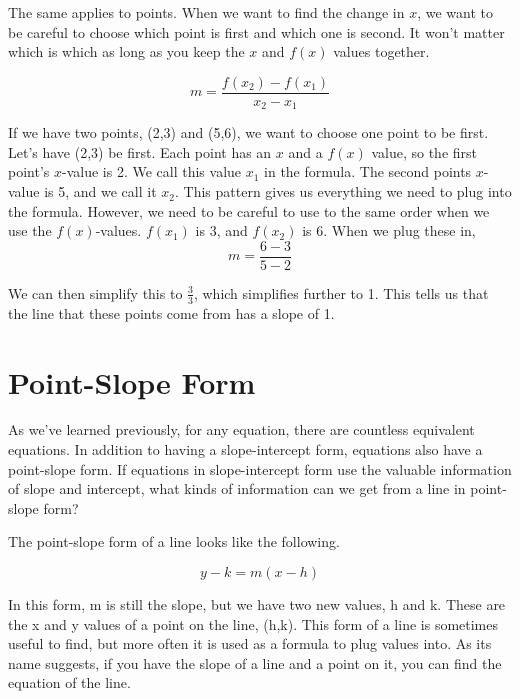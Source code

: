 The same applies to points.  When we want to find the change in $x$, we want to be careful to choose which point is first and which one is second.  It won't matter which is which as long as you keep the $x$ and $f(x)$ values together.

\begin{equation}
m = \frac{f(x_2) - f(x_1)}{x_2 - x_1}
\end{equation}

\begin{example}

If we have two points, (2,3) and (5,6), we want to choose one point to be first.  Let's have (2,3) be first.  Each point has an $x$ and a $f(x)$ value, so the first point's $x$-value is 2.  We call this value $x_1$ in the formula.  The second points $x$-value is 5, and we call it $x_2$.  This pattern gives us everything we need to plug into the formula.  However, we need to be careful to use to the same order when we use the $f(x)$-values.  $f(x_1)$ is 3, and $f(x_2)$ is 6.  When we plug these in, $$m = \frac{6 - 3}{5 - 2}$$

We can then simplify this to $\frac{3}{3}$, which simplifies further to 1.  This tells us that the line that these points come from has a slope of 1.
\end{example}



\section{Point-Slope Form}

As we've learned previously, for any equation, there are countless equivalent equations.  In addition to having a slope-intercept form, equations also have a point-slope form.  If equations in slope-intercept form use the valuable information of slope and intercept, what kinds of information can we get from a line in point-slope form?

The point-slope form of a line looks like the following.

\begin{equation}
y - k = m(x-h)
\end{equation}

In this form, m is still the slope, but we have two new values, h and k.  These are the x and y values of a point on the line, (h,k).  This form of a line is sometimes useful to find, but more often it is used as a formula to plug values into.  As its name suggests, if you have the slope of a line and a point on it, you can find the equation of the line.

